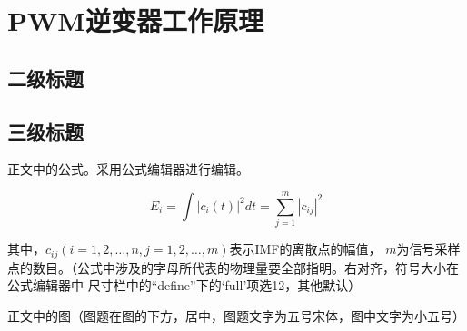 
\section{PWM逆变器工作原理}
\setcounter{figure}{0}
\setcounter{table}{0}
\subsection{二级标题}

\subsection{三级标题}
正文中的公式。采用公式编辑器进行编辑。

\begin{equation}
E_{i}=\int \left | c_{i}(t) \right | ^2dt=\sum_{j=1}^{m}\left | c_{ij}\right | ^2  
\end{equation}

其中，$c_{ij}(i=1,2,\dots,n,j=1,2,\dots,m)$表示IMF的离散点的幅值，
$m$为信号采样点的数目。（公式中涉及的字母所代表的物理量要全部指明。右对齐，符号大小在公式编辑器中
尺寸栏中的“define”下的‘full’项选12，其他默认）

正文中的图{（图题在图的下方，居中，图题文字为五号宋体，图中文字为小五号）}

